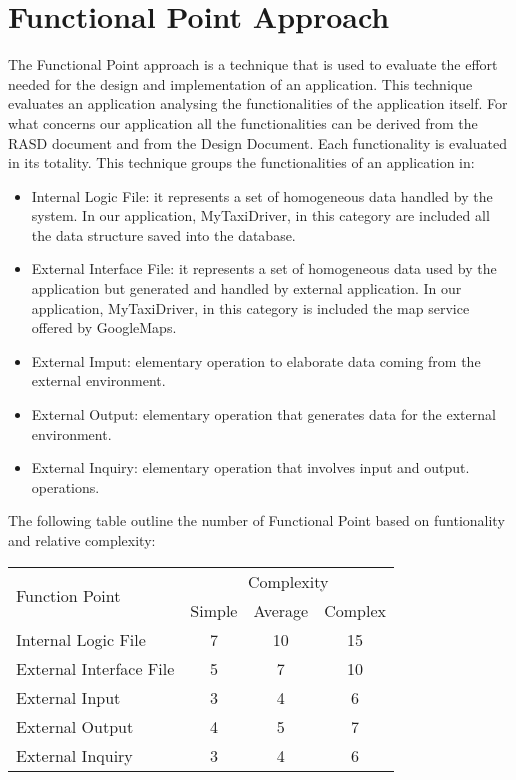 \section{Functional Point Approach}
The Functional Point approach is a technique that is used to evaluate the effort
needed for the design and implementation of an application.
This technique evaluates an application analysing the functionalities of the application itself.
For what concerns our application all the functionalities can be derived from the RASD document and from
the Design Document. Each functionality is evaluated in its totality.
This technique groups the functionalities of an application in:
\begin{itemize}
  \item Internal Logic File: it represents a set of homogeneous data handled
by the system. In our application, MyTaxiDriver, in this category are included all the
data structure saved into the database.
 \item External Interface File: it represents a set of homogeneous data used
by the application but generated and handled by external application. In our application, MyTaxiDriver,
in this category is included the map service offered by GoogleMaps.
 \item External Imput: elementary operation to elaborate data coming from the external environment.
 \item External Output: elementary operation that generates data for the external environment.
 \item External Inquiry: elementary operation that involves input and output.
operations.
\end{itemize}
The following table outline the number of Functional Point based on funtionality
and relative complexity:
\begin{center}
\begin{tabular} { | l | c | c | c | } \hline
  \multirow{2}{*}{Function Point} & \multicolumn{3}{|c|}{Complexity} \\ \cline{2-4}  
  & Simple & Average & Complex \\ \hline 
  Internal Logic File & 7 & 10 & 15 \\ \hline
  External Interface File & 5 & 7 & 10 \\ \hline
  External Input & 3 & 4 & 6 \\ \hline
  External Output & 4 & 5 & 7 \\ \hline
  External Inquiry & 3 & 4 & 6 \\ \hline
\end{tabular}
\end{center}

